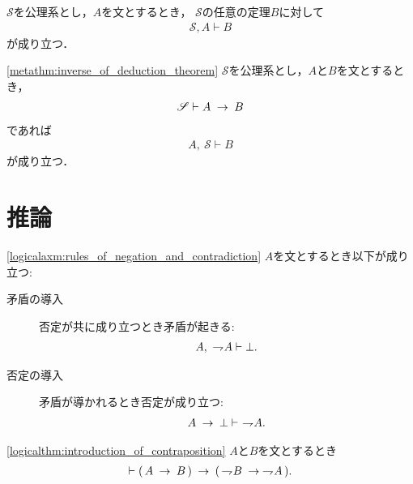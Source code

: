 	\begin{screen}
		\begin{metathm}[公理が増えても証明可能]
			$\mathscr{S}$を公理系とし，$A$を文とするとき，
			$\mathscr{S}$の任意の定理$B$に対して
			\begin{align}
				\mathscr{S}, A \vdash B
			\end{align}
			が成り立つ．
		\end{metathm}
	\end{screen}
	
	\begin{screen}
		\begin{metathm}[演繹法則の逆]
		\ref{metathm:inverse_of_deduction_theorem}
			$\mathscr{S}$を公理系とし，$A$と$B$を文とするとき，
			\begin{align}
				\mathscr{S} \vdash A \hspace{0.25em}\rightarrow\hspace{0.25em} B
			\end{align}
			であれば
			\begin{align}
				A,\ \mathscr{S} \vdash B
			\end{align}
			が成り立つ．
		\end{metathm}
	\end{screen}
	
\section{推論}
	\begin{screen}
		\begin{logicalaxm}[否定と矛盾に関する規則]
		\ref{logicalaxm:rules_of_negation_and_contradiction}
			$A$を文とするとき以下が成り立つ:
			\begin{description}
				\item[矛盾の導入] 否定が共に成り立つとき矛盾が起きる:
					\begin{align}
						A,\ \rightharpoondown\hspace{-0.25em} A \vdash \bot.
					\end{align}
				\item[否定の導入] 矛盾が導かれるとき否定が成り立つ:
					\begin{align}
						A \hspace{0.25em}\rightarrow\hspace{0.25em} \bot \vdash\ \rightharpoondown\hspace{-0.25em} A.
					\end{align}
			\end{description}
		\end{logicalaxm}
	\end{screen}
	
	\begin{screen}
		\begin{logicalthm}[対偶命題が導かれる]
		\ref{logicalthm:introduction_of_contraposition}
			$A$と$B$を文とするとき
			\begin{align}
				\vdash (\, A \hspace{0.25em}\rightarrow\hspace{0.25em} B\, ) 
				\hspace{0.25em}\rightarrow\hspace{0.25em} (\, \rightharpoondown\hspace{-0.25em} B \hspace{0.25em}\rightarrow\hspace{0.25em} \rightharpoondown\hspace{-0.25em} A\, ).
			\end{align}
		\end{logicalthm}
	\end{screen}
	
